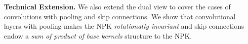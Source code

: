 \textbf{Technical Extension.} We also extend the dual view to cover the cases of convolutions with pooling and skip connections. We show that convolutional layers with pooling makes the NPK \emph{rotationally invariant} and skip connections endow a \emph{sum of product of base kernels} structure to the NPK.
\begin{comment}

CNN, Resnet to say that the framework can be extended successfully.

Perhaps the second important and powerful insights lie in the experimental implication contribution

why do we even care for a specific theory?

All through we differentiate from \cite{npk}
\end{comment}